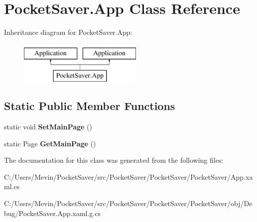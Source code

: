 \hypertarget{class_pocket_saver_1_1_app}{}\section{Pocket\+Saver.\+App Class Reference}
\label{class_pocket_saver_1_1_app}
Inheritance diagram for Pocket\+Saver.\+App\+:\begin{figure}[H]
\begin{center}
\leavevmode
\includegraphics[height=2.000000cm]{class_pocket_saver_1_1_app}
\end{center}
\end{figure}
\subsection*{Static Public Member Functions}
\begin{DoxyCompactItemize}
\item 
\mbox{\label{class_pocket_saver_1_1_app_a1ceff66a22060a629ba6db62fe1392a1}} 
static void {\bfseries Set\+Main\+Page} ()
\item 
\mbox{\label{class_pocket_saver_1_1_app_ab92761d9b4c322a99b3a0af0e32ccf53}} 
static Page {\bfseries Get\+Main\+Page} ()
\end{DoxyCompactItemize}


The documentation for this class was generated from the following files\+:\begin{DoxyCompactItemize}
\item 
C\+:/\+Users/\+Mevin/\+Pocket\+Saver/src/\+Pocket\+Saver/\+Pocket\+Saver/\+Pocket\+Saver/App.\+xaml.\+cs\item 
C\+:/\+Users/\+Mevin/\+Pocket\+Saver/src/\+Pocket\+Saver/\+Pocket\+Saver/\+Pocket\+Saver/obj/\+Debug/Pocket\+Saver.\+App.\+xaml.\+g.\+cs\end{DoxyCompactItemize}
